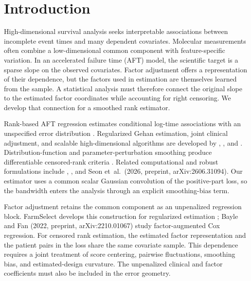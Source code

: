 \section{Introduction}
\label{sec:introduction}
High-dimensional survival analysis seeks interpretable associations between incomplete event times and many dependent covariates. Molecular measurements often combine a low-dimensional common component with feature-specific variation. In an accelerated failure time (AFT) model, the scientific target is a sparse slope on the observed covariates. Factor adjustment offers a representation of their dependence, but the factors used in estimation are themselves learned from the sample. A statistical analysis must therefore connect the original slope to the estimated factor coordinates while accounting for right censoring. We develop that connection for a smoothed rank estimator.

Rank-based AFT regression estimates conditional log-time associations with an unspecified error distribution \citep{Wei1992,JinEtAl2003}. Regularized Gehan estimation, joint clinical adjustment, and scalable high-dimensional algorithms are developed by \citet{CaiEtAl2009}, \citet{Johnson2009}, and \citet{SuderMolstad2022}. Distribution-function and parameter-perturbation smoothing produce differentiable censored-rank criteria \citep{Heller2007,JohnsonStrawderman2009}. Related computational and robust formulations include \citet{ChoiChoi2021}, \citet{LiEtAl2021}, and Seon et~al.\ (2026, preprint, arXiv:2606.31094). Our estimator uses a common scalar Gaussian convolution of the positive-part loss, so the bandwidth enters the analysis through an explicit smoothing-bias term.

Factor adjustment retains the common component as an unpenalized regression block. FarmSelect develops this construction for regularized estimation \citep{FanEtAl2020}; Bayle and Fan (2022, preprint, arXiv:2210.01067) study factor-augmented Cox regression. For censored rank estimation, the estimated factor representation and the patient pairs in the loss share the same covariate sample. This dependence requires a joint treatment of score centering, pairwise fluctuations, smoothing bias, and estimated-design curvature. The unpenalized clinical and factor coefficients must also be included in the error geometry.

